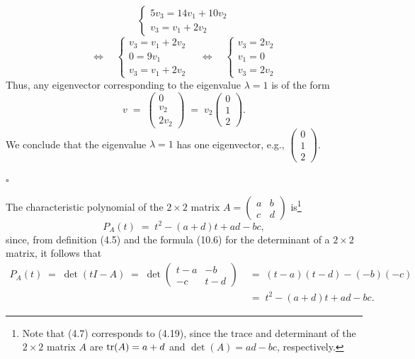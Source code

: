 \begin{itemize}
\[\begin{cases}
5v_3 = 14v_1+10v_2\\
v_3 = v_1+2v_2
\end{cases}
\]
\[
\Longleftrightarrow\quad
\begin{cases}
v_3 = v_1+2v_2\\
0 = 9v_1\\
v_3 = v_1+2v_2
\end{cases}
\quad\Longleftrightarrow\quad
\begin{cases}
v_3 = 2v_2\\
v_1 = 0\\
v_3 = 2v_2
\end{cases}
\]
Thus, any eigenvector corresponding to the eigenvalue $\lambda = 1$ is of the form
\[
v \;=\; \begin{pmatrix}0\\ v_2\\ 2v_2\end{pmatrix} \;=\; v_2\begin{pmatrix}0\\1\\2\end{pmatrix}.
\]
We conclude that the eigenvalue $\lambda = 1$ has one eigenvector, e.g.,
$\begin{pmatrix}0\\1\\2\end{pmatrix}$.
\end{itemize}
\hfill$\square$\par\medskip

\begin{examplex}
The characteristic polynomial of the $2 \times 2$ matrix $A = \begin{pmatrix} a & b\\ c &
d\end{pmatrix}$ is\footnote{Note that (4.7) corresponds to (4.19), since the trace and
determinant of the $2 \times 2$ matrix $A$ are $\operatorname{tr}(A) = a+d$ and $\det(A) = ad-bc$,
respectively.}
\begin{equation}
P_A(t) \;=\; t^2 - (a+d)t + ad - bc,
\end{equation}
since, from definition (4.5) and the formula (10.6) for the determinant of a
$2 \times 2$ matrix, it follows that
\begin{align*}
P_A(t) \;=\; \det(tI-A) \;=\; \det\begin{pmatrix} t-a & -b\\ -c & t-d\end{pmatrix}
&\;=\; (t-a)(t-d) - (-b)(-c)\\
&\;=\; t^2 - (a+d)t + ad - bc.
\end{align*}
\end{examplex}

